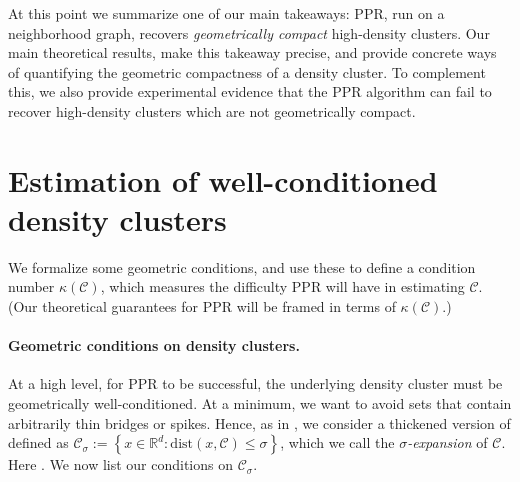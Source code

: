 \documentclass[11pt,twoside]{article}
\newcommand{\set}[1]{\left\{#1\right\}}
\newcommand{\Reals}{\mathbb{R}}
\newcommand{\norm}[1]{\left\lVert#1\right\rVert}
\newcommand{\1}{\mathbf{1}}
\newcommand{\dist}{\mathrm{dist}}
\newcommand{\Cbb}{\mathbb{C}}
\newcommand{\Cset}{\mathcal{C}}
\newcommand{\Csig}{\Cset_{\sigma}}
\begin{document}
\noindent At this point we summarize one of our main takeaways: 
PPR, run on a neighborhood graph, recovers \emph{geometrically
compact} high-density clusters. Our main theoretical results, make this takeaway 
precise, and provide concrete ways of quantifying the geometric
compactness of a density cluster. To complement this, we also provide experimental
evidence that the PPR algorithm can fail to recover high-density clusters which are not
geometrically compact.

\section{Estimation of well-conditioned density clusters}
\label{sec: consistent_cluster_estimation_with_ppr}

We formalize some geometric conditions, and use these to define a condition
number $\kappa(\Cset)$, which measures the difficulty PPR will have in  
estimating $\Cset$. (Our theoretical guarantees for PPR will be framed in terms 
of $\kappa(\Cset)$.)

\paragraph{Geometric conditions on density clusters.} At a high level, for PPR
to be successful, the underlying density cluster must be geometrically
well-conditioned.  At a minimum, we want to avoid sets that contain arbitrarily
thin bridges or spikes.  Hence, as in \citet{chaudhuri2010}, we consider a
thickened version of \smash{$\Cset \in \Cbb_f(\lambda)$} defined as 
$\Csig := \set{x \in \Reals^d: \dist(x,\Cset) \leq \sigma}$, which 
we call the \emph{$\sigma$-expansion} of $\Cset$. Here 
\smash{$\dist(x,\Cset) := \inf_{y \in \Cset} \norm{y - x}$}.  We now list our
conditions on $\Csig$.
\end{document}
